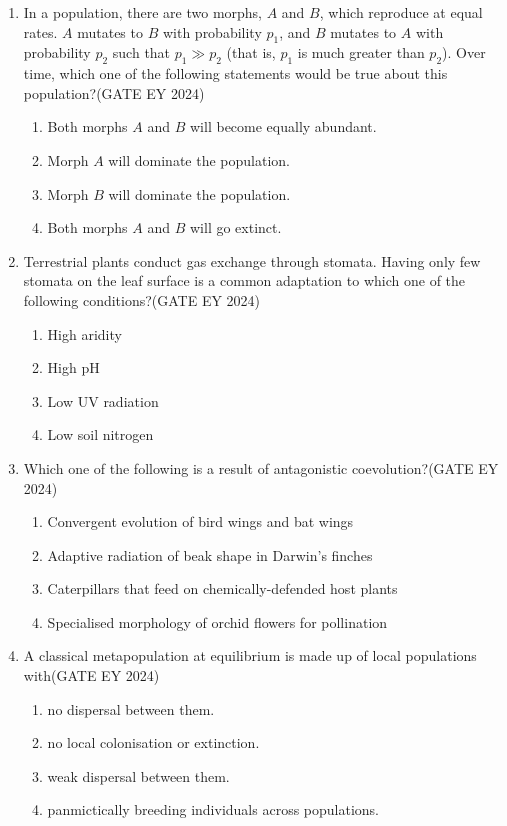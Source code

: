 \begin{enumerate}
\item In a population, there are two morphs, $A$ and $B$, which reproduce at equal rates. $A$ mutates to $B$ with probability $p_1$, and $B$ mutates to $A$ with probability $p_2$ such that $p_1 \gg p_2$ (that is, $p_1$ is much greater than $p_2$). Over time, which one of the following statements would be true about this population?\hfill{(GATE EY 2024)}
    \begin{enumerate}
        \item Both morphs $A$ and $B$ will become equally abundant.
        \item Morph $A$ will dominate the population.
        \item Morph $B$ will dominate the population.
        \item Both morphs $A$ and $B$ will go extinct.
    \end{enumerate}

\item Terrestrial plants conduct gas exchange through stomata. Having only few stomata on the leaf surface is a common adaptation to which one of the following conditions?\hfill{(GATE EY 2024)}
    \begin{multicols}{2}
    \begin{enumerate}
        \item High aridity
        \item High pH
        \item Low UV radiation
        \item Low soil nitrogen
    \end{enumerate}
    \end{multicols}

\item Which one of the following is a result of antagonistic coevolution?\hfill{(GATE EY 2024)}
    \begin{enumerate}
        \item Convergent evolution of bird wings and bat wings
        \item Adaptive radiation of beak shape in Darwin's finches
        \item Caterpillars that feed on chemically-defended host plants
        \item Specialised morphology of orchid flowers for pollination
    \end{enumerate}

\item A classical metapopulation at equilibrium is made up of local populations with\hfill{(GATE EY 2024)}
    \begin{enumerate}
        \item no dispersal between them.
        \item no local colonisation or extinction.
        \item weak dispersal between them.
        \item panmictically breeding individuals across populations.
    \end{enumerate}


\end{enumerate}
